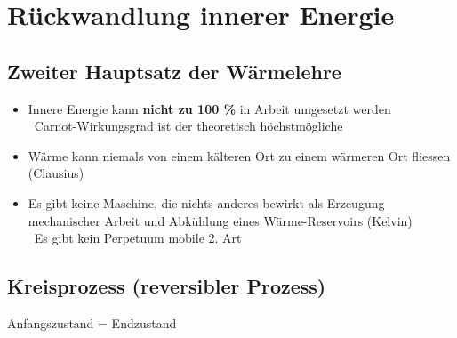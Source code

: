 \section{Rückwandlung innerer Energie}

\subsection{Zweiter Hauptsatz der Wärmelehre}

\begin{itemize}
	\item Innere Energie kann \textbf{nicht zu 100 \%} in Arbeit umgesetzt werden \\
		\textrightarrow\ Carnot-Wirkungsgrad ist der theoretisch höchstmögliche
	\item Wärme kann niemals  von einem kälteren Ort zu einem wärmeren Ort fliessen (Clausius)
	\item Es gibt keine  Maschine, die nichts anderes bewirkt als Erzeugung mechanischer Arbeit und 
		Abkühlung eines Wärme-Reservoirs (Kelvin) \\
		\textrightarrow\ Es gibt kein Perpetuum mobile 2. Art
\end{itemize}


\subsection{Kreisprozess (reversibler Prozess)}

\begin{center}
	Anfangszustand = Endzustand
\end{center}


